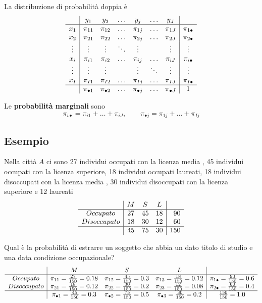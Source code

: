 \documentclass[
  11pt,
]{book}
\theoremstyle{mytheoremstyle}
\theoremstyle{mydefstyle}
\begin{document}
La distribuzione di probabilità doppia è
\[
\begin{array}{c|cccccc|c}
 &y_1 &y_2 &\ldots &y_j &\ldots &y_J &\\
  \hline
  x_1 & \pi_{11} & \pi_{12} & \ldots &\pi_{1j} &\ldots &\pi_{1J} & \pi_{1\bullet}\\
  x_2 & \pi_{21} & \pi_{22} & \ldots &\pi_{2j} &\ldots &\pi_{2J} & \pi_{2\bullet}\\
\vdots& \vdots & \vdots &\ddots &\vdots & &\vdots &\vdots \\
  x_i & \pi_{i1} & \pi_{i2} & \ldots &\pi_{ij} &\ldots & \pi_{iJ}& \pi_{i\bullet}\\
\vdots& \vdots & \vdots & &\vdots &\ddots &\vdots &\vdots \\
  x_I & \pi_{I1} & \pi_{I2} & \ldots &\pi_{Ij} &\ldots &\pi_{IJ} &\pi_{I\bullet}\\
\hline
   & \pi_{\bullet 1}& \pi_{\bullet 2}& \ldots& \pi_{\bullet j}& \ldots& \pi_{\bullet J}& 1\\ 
\end{array}
\]

Le \textbf{probabilità marginali} sono
\[\pi_{i\bullet}=\pi_{i1}+\ldots+\pi_{iJ},\qquad \pi_{\bullet j}=\pi_{1j}+\ldots+\pi_{Ij} \]

\subsection{Esempio}\label{esempio-6}

Nella città \(A\) ci sono 27 individui occupati con la licenza media , 45 individui occupati con la licenza superiore, 18 individui occupati laureati, 18 individui disoccupati con la licenza media , 30 individui disoccupati con la licenza superiore e 12 laureati
\[
\begin{array}{c|ccc|r}
         &M             &   S              &L  & \\   \hline
Occupato    & 27     & 45     & 18     & 90\\
Disoccupato & 18     & 30     & 12     & 60\\ \hline
         & 45 & 75 & 30 & 150
\end{array}
\]

Qual è la probabilità di estrarre un soggetto che abbia un dato titolo di studio e una data condizione occupazionale?
\[
\begin{array}{c|ccc|c}
         &M & S &L  & \\   \hline
Occupato    & \pi_{11}=\frac {27}{150}=0.18    
         & \pi_{12}=\frac{45}{150}=0.3    
         & \pi_{13}=\frac{18}{150}=0.12 
         & \pi_{1\bullet}=\frac{90}{150}=0.6\\
Disoccupato & \pi_{21}=\frac {18}{150}=0.12    
         & \pi_{22}=\frac{30}{150}=0.2    
         & \pi_{23}=\frac{12}{150}=0.08 
         & \pi_{2\bullet}=\frac{60}{150}=0.4\\ \hline
         & \pi_{\bullet1}=\frac{45}{150}=0.3    
         & \pi_{\bullet2}=\frac{75}{150}=0.5 
         & \pi_{\bullet3}=\frac{30}{150}=0.2
         & \frac {150}{150}=1.0
\end{array}
\]
\end{document}
